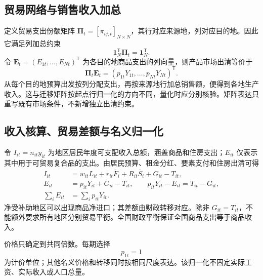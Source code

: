 \documentclass[UTF8,a4paper,zihao=-4,fontset=windows]{ctexart}
\numberwithin{equation}{section}
\begin{document}
\subsection{贸易网络与销售收入加总}
\label{sec:trade-network}
定义贸易支出份额矩阵 $\bm\Pi_t=[\pi_{ij,t}]_{N\times N}$，其行对应来源地，列对应目的地。因此它满足列加总约束
\begin{equation}
  \mathbf 1_N^{\mathsf T}\bm\Pi_t=\mathbf 1_N^{\mathsf T}.
  \label{eq:trade-column-stochastic}
\end{equation}
令 $\mathbf E_t=(E_{1t},\ldots,E_{Nt})^{\mathsf T}$ 为各目的地商品支出的列向量，则产品市场出清等价于
\begin{equation}
  \bm\Pi_t\mathbf E_t
   =(p_{1t}Y_{1t},\ldots,p_{Nt}Y_{Nt})^{\mathsf T}.
  \label{eq:goods-network-clearing}
\end{equation}
从每个目的地预算出发按列分配支出，再按来源地行加总销售额，便得到各地生产收入。这与迁移矩阵按起点行归一化的方向不同，量化时应分别核验。矩阵表达只重写既有市场条件，不新增独立出清约束。

\subsection{收入核算、贸易差额与名义归一化}
令 $I_{it}=n_{it}y_{it}$ 为地区居民年度可支配收入总额，涵盖商品和住房支出；$E_{it}$ 仅表示其中用于可贸易复合品的支出。由居民预算、租金分红、要素支付和住房出清可得
\begin{align}
  I_{it}&=w_{it}L_{it}+r_{it}\bar F_i+R_{it}\bar S_i+G_{it}-T_{it},\\
  E_{it}&=p_{it}Y_{it}+G_{it}-T_{it},\qquad
  p_{it}Y_{it}-E_{it}=T_{it}-G_{it},
  \label{eq:regional-accounting}\\
  \sum_iE_{it}&=\sum_ip_{it}Y_{it}.
  \label{eq:walras-accounting}
\end{align}
净受补助地区可以出现商品净进口；其差额由财政转移对应。除非 $G_{it}=T_{it}$，不能额外要求所有地区分别贸易平衡。全国财政平衡保证全国商品支出等于商品收入。

价格只确定到共同倍数。每期选择
\begin{equation}
  p_{1t}=1
  \label{eq:numeraire}
\end{equation}
为计价单位；其他名义价格和转移同时按相同尺度表达。该归一化不固定实际工资、实际收入或人口总量。
\end{document}
